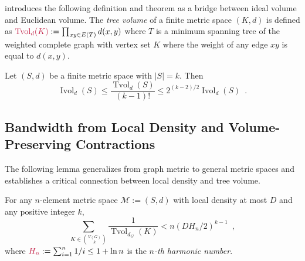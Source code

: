 \documentclass{patmorin}
\makeatletter
\newcommand{\defin}[1]{\emph{\textcolor{brightmaroon}{#1}}}
\def\mathcolor#1#{\@mathcolor{#1}}
\def\@mathcolor#1#2#3{%
  \protect\leavevmode
  \begingroup
    \color#1{#2}#3%
  \endgroup
}
\newcommand{\mathdefin}[1]{\mathcolor{brightmaroon}{#1}}
\DeclareMathOperator{\ivol}{Ivol}
\DeclareMathOperator{\tvol}{Tvol}
\makeatother
\begin{document}
\citet{feige:approximating} introduces the following definition and theorem as a bridge between ideal volume and Euclidean volume. The \defin{tree volume} of a finite metric space $(K,d)$ is defined as $\mathdefin{\tvol_d(K)}:=\prod_{xy\in E(T)} d(x,y)$ where $T$ is a minimum spanning tree of the weighted complete graph with vertex set $K$ where the weight of any edge $xy$ is equal to $d(x,y)$.

\begin{lem}
  Let $(S,d)$ be a finite metric space with $|S|=k$.  Then
  \[
    \ivol_{d}(S) \le \frac{\tvol_d(S)}{(k-1)!} \le 2^{(k-2)/2}\ivol_d(S) \enspace .
  \]
\end{lem}

\subsection{Bandwidth from Local Density and Volume-Preserving Contractions}

The following lemma generalizes \citet[Theorem~10]{feige:approximating} from graph metric to general metric spaces and establishes a critical connection between local density and tree volume.

\begin{lem}\label{reciprocal_sum}
  For any $n$-element metric space $\mathcal{M}:=(S,d)$ with local density at most $D$ and any positive integer $k$,
  \[
    \sum_{K\in \binom{V(G)}{k}}\frac{1}{\tvol_{d_G}(K)} < n(DH_n/2)^{k-1} \enspace ,
  \]
  where $\mathdefin{H_n}:=\sum_{i=1}^n 1/i\le 1+\ln n$ is the \defin{$n$-th harmonic number}.
\end{lem}
\end{document}
